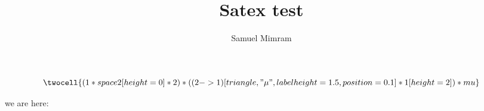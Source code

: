 \documentclass[a4paper]{article}
\title{Satex test}
\author{Samuel Mimram}
\begin{document}
\maketitle

\[
  \twocell{(1 * space2[height=0] * 2) * ((2->1)[triangle,"\mu",labelheight=1.5,position=0.1] * 1[height=2]) * mu}
\]









we are here:













\end{document}
